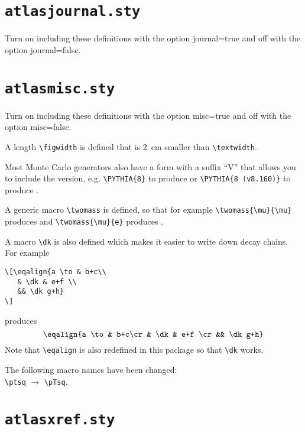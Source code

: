 \documentclass[UKenglish,texlive=2013]{\ATLASLATEXPATH atlasdoc}
\newcommand{\File}[1]{\texttt{#1}\xspace}
\newcommand{\Macro}[1]{\texttt{\textbackslash #1}\xspace}
\newcommand{\Option}[1]{\textsf{#1}\xspace}
\begin{document}
{\newpage
\section{\File{atlasjournal.sty}}

Turn on including these definitions with the option \Option{journal=true} and off with the option \Option{journal=false}.




\newpage
\section{\File{atlasmisc.sty}}

Turn on including these definitions with the option \Option{misc=true} and off with the option \Option{misc=false}.



\noindent A length \Macro{figwidth} is defined that is \SI{2}{\cm} smaller than \Macro{textwidth}.

\noindent Most Monte Carlo generators also have a form with a suffix \enquote{V}
that allows you to include the version, e.g.
\verb|\PYTHIA{8}| to produce  or
\verb|\PYTHIA{8 (v8.160)}| to produce .

\noindent A generic macro \verb|\twomass| is defined, so that for example
\verb|\twomass{\mu}{\mu}| produces \twomass{\mu}{\mu} and \verb|\twomass{\mu}{e}| produces .

A macro \verb|\dk| is also defined which makes it easier to write down decay chains.
For example
\begin{verbatim}
\[\eqalign{a \to & b+c\\
   & \dk & e+f \\
   && \dk g+h}
\]
\end{verbatim}
produces
\[\eqalign{a \to & b+c\cr
   & \dk & e+f \cr
   && \dk g+h}
\]
Note that \Macro{eqalign} is also redefined in this package so that \Macro{dk} works.

The following macro names have been changed:\\
\verb|\ptsq| $\to$ \verb|\pTsq|.


\newpage
\section{\File{atlasxref.sty}}

}
\end{document}
